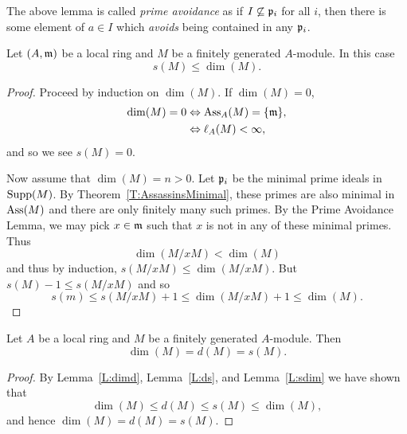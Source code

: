 \documentclass{ximera}
\begin{document}
\begin{remark}
  The above lemma is called \textit{prime avoidance} as if
  $I\not\subseteq \mathfrak{p}_i$ for all $i$, then there is some element of $a
  \in I$ which \textit{avoids} being contained in any $\mathfrak{p}_i$.
\end{remark}












\begin{lemma}\label{L:sdim}
  Let $(A,\mathfrak{m})$ be a local ring and $M$ be a finitely generated
  $A$-module. In this case
  \[
  s(M)\le \dim(M).
  \]
  \begin{proof}
    Proceed by induction on $\dim(M)$. If $\dim(M) = 0$,
    \begin{align*}
      \dim(M) = 0 &\Leftrightarrow \operatorname{Ass}_A(M)=\{\mathfrak{m}\}, \\
      &\Leftrightarrow \ell_A(M) <\infty,
    \end{align*}
    and so we see $s(M) = 0$.
    
    Now assume that $\dim(M)=n>0$. Let $\mathfrak{p}_i$ be the minimal prime
    ideals in $\operatorname{Supp}(M)$. By Theorem~\ref{T:AssassinsMinimal}, these
    primes are also minimal in $\operatorname{Ass}(M)$ and there are only finitely
    many such primes. By the Prime Avoidance
    Lemma, we may pick $x\in\mathfrak{m}$ such that $x$ is not in any of these
    minimal primes. Thus
    \[
    \dim(M/xM) <\dim(M)
    \]
    and thus by induction, $s(M/xM)\le\dim(M/xM)$. But $s(M)-1\le s(M/xM)$ and so
    \[
    s(m) \le s(M/xM) +1 \le \dim(M/xM) +1 \le \dim(M).
    \]
  \end{proof}
\end{lemma}



\begin{theorem}\label{T:dimension}
  Let $A$ be a local ring and $M$ be a finitely generated
  $A$-module. Then
  \[
  \dim(M) = d(M) = s(M).
  \]
  \begin{proof}
    By Lemma~\ref{L:dimd}, Lemma~\ref{L:ds}, and Lemma~\ref{L:sdim} we have shown that
    \[
    \dim(M)\le d(M) \le s(M) \le \dim(M),
    \]
    and hence $\dim(M) = d(M) = s(M)$.
  \end{proof}
\end{theorem}
\end{document}
